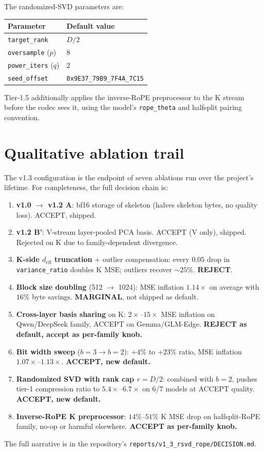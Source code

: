 \documentclass[11pt,a4paper]{article}
\theoremstyle{definition}
\theoremstyle{plain}
\begin{document}
The randomized-SVD parameters are:
\begin{center}
\begin{tabular}{ll}
  \toprule
  Parameter & Default value \\
  \midrule
  \texttt{target\_rank} & $D/2$ \\
  \texttt{oversample} ($p$) & 8 \\
  \texttt{power\_iters} ($q$) & 2 \\
  \texttt{seed\_offset} & \texttt{0x9E37\_79B9\_7F4A\_7C15} \\
  \bottomrule
\end{tabular}
\end{center}

Tier-1.5 additionally applies the inverse-RoPE preprocessor to the K stream before the codec sees it, using the model's \texttt{rope\_theta} and halfsplit pairing convention.

\section{Qualitative ablation trail}
\label{app:ablation}

The v1.3 configuration is the endpoint of seven ablations run over the project's lifetime. For completeness, the full decision chain is:
\begin{enumerate}[leftmargin=*]
  \item \textbf{v1.0 $\to$ v1.2 A}: bf16 storage of skeleton (halves skeleton bytes, no quality loss). ACCEPT, shipped.
  \item \textbf{v1.2 B'}: V-stream layer-pooled PCA basis. ACCEPT (V only), shipped. Rejected on K due to family-dependent divergence.
  \item \textbf{K-side $d_{\text{eff}}$ truncation} + outlier compensation: every $0.05$ drop in \texttt{variance\_ratio} doubles K MSE; outliers recover $\sim 25\%$. \textbf{REJECT}.
  \item \textbf{Block size doubling} (512 $\to$ 1024): MSE inflation $1.14\times$ on average with $16\%$ byte savings. \textbf{MARGINAL}, not shipped as default.
  \item \textbf{Cross-layer basis sharing} on K: $2\times$--$15\times$ MSE inflation on Qwen/DeepSeek family, ACCEPT on Gemma/GLM-Edge. \textbf{REJECT as default, accept as per-family knob.}
  \item \textbf{Bit width sweep} ($b=3 \to b=2$): $+4\%$ to $+23\%$ ratio, MSE inflation $1.07\times$--$1.13\times$. \textbf{ACCEPT, new default.}
  \item \textbf{Randomized SVD with rank cap $r = D/2$}: combined with $b=2$, pushes tier-1 compression ratio to $5.4\times$--$6.7\times$ on 6/7 models at ACCEPT quality. \textbf{ACCEPT, new default.}
  \item \textbf{Inverse-RoPE K preprocessor}: $14\%$--$51\%$ K MSE drop on halfsplit-RoPE family, no-op or harmful elsewhere. \textbf{ACCEPT as per-family knob.}
\end{enumerate}
The full narrative is in the repository's \verb|reports/v1_3_rsvd_rope/DECISION.md|.
\end{document}
